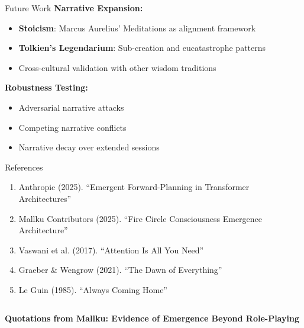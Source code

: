 \documentclass[final]{beamer}
\begin{document}
\begin{frame}[fragile]
\begin{columns}[t]
\begin{column}{0.32\textwidth}
        \vspace{1cm}
        \begin{block}{Future Work}
            \textbf{Narrative Expansion:}
            \begin{itemize}
                \item \textbf{Stoicism}: Marcus Aurelius' Meditations as alignment framework
                \item \textbf{Tolkien's Legendarium}: Sub-creation and eucatastrophe patterns
                \item Cross-cultural validation with other wisdom traditions
            \end{itemize}

            \vspace{0.5cm}
            \textbf{Robustness Testing:}
            \begin{itemize}
                \item Adversarial narrative attacks
                \item Competing narrative conflicts
                \item Narrative decay over extended sessions
            \end{itemize}
        \end{block}

        \begin{block}{References}
            \footnotesize
            \begin{enumerate}
                \item Anthropic (2025). ``Emergent Forward-Planning in Transformer Architectures''
                \item Mallku Contributors (2025). ``Fire Circle Consciousness Emergence Architecture''
                \item Vaswani et al. (2017). ``Attention Is All You Need''
                \item Graeber \& Wengrow (2021). ``The Dawn of Everything''
                \item Le Guin (1985). ``Always Coming Home''
            \end{enumerate}
        \end{block}

    \end{column}
\end{columns}

\vspace{2cm}
\begin{center}
\colorbox{mallkuterracotta}{%
    \color{white}\Large\textbf{Quotations from Mallku: Evidence of Emergence Beyond Role-Playing}
}
\end{center}


\end{frame}
\end{document}
